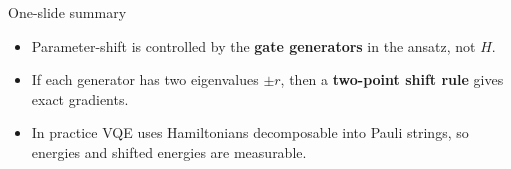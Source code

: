 \documentclass[aspectratio=169]{beamer}
\begin{document}
\begin{frame}{One-slide summary}
\begin{itemize}
\item Parameter-shift is controlled by the \textbf{gate generators} in the ansatz, not $H$.
\item If each generator has two eigenvalues $\pm r$, then a \textbf{two-point shift rule} gives exact gradients.
\item In practice VQE uses Hamiltonians decomposable into Pauli strings, so energies and shifted energies are measurable.
\end{itemize}
\end{frame}
\end{document}
